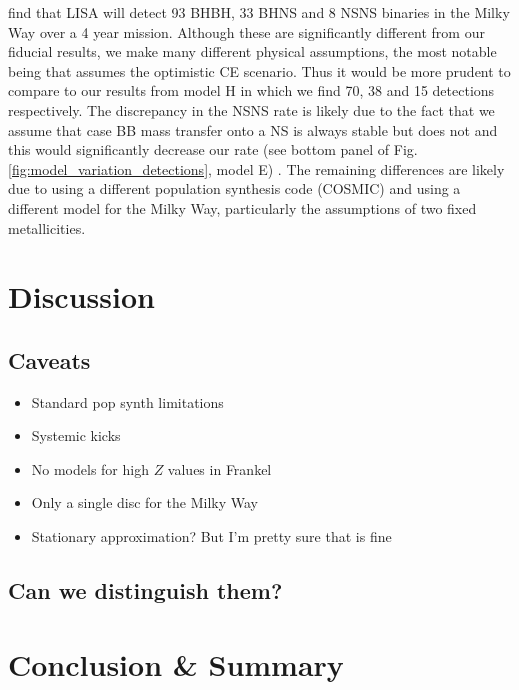 \documentclass[twocolumn]{aastex63}
\newcommand{\modCaseBB}{E}
\newcommand{\modOpt}{H}
\begin{document}
\citet{Breivik+2019} find that LISA will detect 93 BHBH, 33 BHNS and 8 NSNS binaries in the Milky Way over a 4 year mission. Although these are significantly different from our fiducial results, we make many different physical assumptions, the most notable being that \citet{Breivik+2019} assumes the optimistic CE scenario. Thus it would be more prudent to compare to our results from model \modOpt{} in which we find 70, 38 and 15 detections respectively. The discrepancy in the NSNS rate is likely due to the fact that we assume that case BB mass transfer onto a NS is always stable but \citet{Breivik+2019} does not and this would significantly decrease our rate (see bottom panel of Fig.\,\ref{fig:model_variation_detections}, model \modCaseBB{}) . The remaining differences are likely due to using a different population synthesis code (COSMIC) and using a different model for the Milky Way, particularly the assumptions of two fixed metallicities.

\section{Discussion} \label{sec:discussion}
\subsection{Caveats}
\begin{itemize}
    \item Standard pop synth limitations
    \item Systemic kicks
    \item No models for high $Z$ values in Frankel
    \item Only a single disc for the Milky Way
    \item Stationary approximation? But I'm pretty sure that is fine
\end{itemize}

\subsection{Can we distinguish them?}

\section{Conclusion \& Summary} \label{sec:conclusion}
\end{document}
